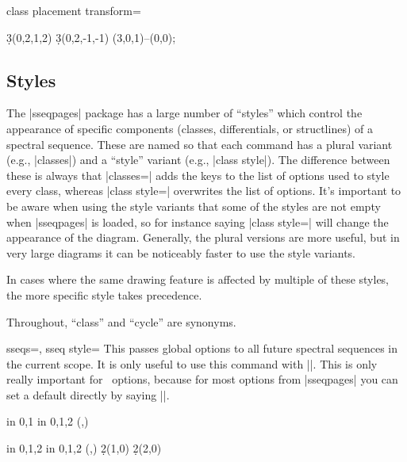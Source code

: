 \documentclass{ltxdoc}
\begin{document}
\begin{sseqdata}[name=ex1,degree={#1}{1-#1}]
\begin{key}{class placement transform=}
\begin{codeexample}[width=5cm]
\begin{sseqpage}[classes=fill,class placement transform={rotate=40},
                 cohomological Serre grading,differentials=blue,scale=0.7]
\d3(0,2,1,2)
\d3(0,2,-1,-1)
\draw[->,red](3,0,1)--(0,0);
\end{sseqpage}
\end{codeexample}
\end{key}

\subsection{Styles}
The |sseqpages| package has a large number of ``styles'' which control the appearance of specific components (classes, differentials, or structlines) of a spectral sequence. These are named so that each command has a plural variant (e.g., |classes|) and a ``style'' variant (e.g., |class style|). The difference between these is always that |classes=| adds the keys to the list of options used to style every class, whereas |class style=| overwrites the list of options. It's important to be aware when using the style variants that some of the styles are not empty when |sseqpages| is loaded, so for instance saying |class style={}| will change the appearance of the diagram. Generally, the plural versions are more useful, but in very large diagrams it can be noticeably faster to use the style variants.

In cases where the same drawing feature is affected by multiple of these styles, the more specific style takes precedence.

Throughout, ``class'' and ``cycle'' are synonyms.
\begin{keylist}{sseqs=, sseq style=}
This passes global options to all future spectral sequences in the current scope. It is only useful to use this command with |\sseqset|. This is only really important for \tikzname\ options, because for most options from |sseqpages| you can set a default directly by saying ||.
\begin{codeexample}[]
\begin{sseqpage}
\foreach \x in {0,1} \foreach \y in {0,1,2}{
    \class(\x,\y)
}
\end{sseqpage}
\hskip1cm
\begin{sseqpage}[Adams grading,classes={fill,blue}]
\foreach \x in {0,1,2} \foreach \y in {0,1,2}{
    \class(\x,\y)
}
\d2(1,0)
\d2(2,0)
\end{sseqpage}
\end{codeexample}
\end{keylist}


\end{sseqdata}
\end{document}
